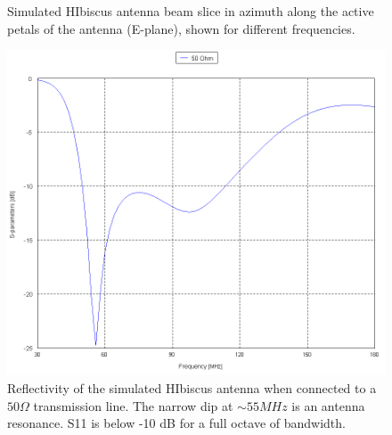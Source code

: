 \begin{figure}[htb]
\begin{minipage}[b]{0.47\textwidth}
\caption{Simulated HIbiscus antenna beam slice in azimuth along the active petals of the antenna (E-plane), shown for different frequencies.}
\label{Fig:HIsym_beam_2}
\end{minipage}
\end{figure}
 
\begin{figure}[htb]
\centering
\begin{minipage}[b]{0.49\textwidth}
\centering
\includegraphics[width=0.95\linewidth]{SCIHI_system/figures/HIbiscus_S11_50_Cart.png}
\caption{Reflectivity of the simulated HIbiscus antenna when connected to a $50 \Omega$ transmission line. The narrow dip at $\sim 55 MHz$ is an antenna resonance. S11 is below -10 dB for a full octave of bandwidth.}
\label{Fig:HIsim_S11_dB}
\end{minipage}%
\begin{minipage}[b]{0.02\textwidth}
\hspace{1cm}
\end{minipage}%
\begin{minipage}[b]{0.46\textwidth}
\centering

\end{minipage}
\end{figure}
